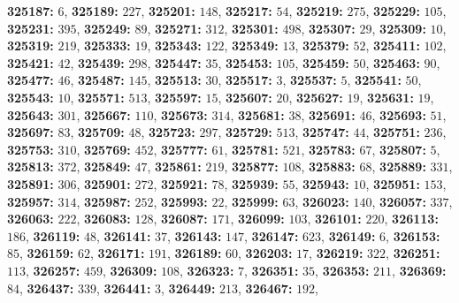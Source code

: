\textsf{\bfseries 325187:} $6$, \textsf{\bfseries 325189:} $227$, \textsf{\bfseries 325201:} $148$, \textsf{\bfseries 325217:} $54$, \textsf{\bfseries 325219:} $275$, \textsf{\bfseries 325229:} $105$, \textsf{\bfseries 325231:} $395$, \textsf{\bfseries 325249:} $89$, \textsf{\bfseries 325271:} $312$, \textsf{\bfseries 325301:} $498$, \textsf{\bfseries 325307:} $29$, \textsf{\bfseries 325309:} $10$, \textsf{\bfseries 325319:} $219$, \textsf{\bfseries 325333:} $19$, \textsf{\bfseries 325343:} $122$, \textsf{\bfseries 325349:} $13$, \textsf{\bfseries 325379:} $52$, \textsf{\bfseries 325411:} $102$, \textsf{\bfseries 325421:} $42$, \textsf{\bfseries 325439:} $298$, \textsf{\bfseries 325447:} $35$, \textsf{\bfseries 325453:} $105$, \textsf{\bfseries 325459:} $50$, \textsf{\bfseries 325463:} $90$, \textsf{\bfseries 325477:} $46$, \textsf{\bfseries 325487:} $145$, \textsf{\bfseries 325513:} $30$, \textsf{\bfseries 325517:} $3$, \textsf{\bfseries 325537:} $5$, \textsf{\bfseries 325541:} $50$, \textsf{\bfseries 325543:} $10$, \textsf{\bfseries 325571:} $513$, \textsf{\bfseries 325597:} $15$, \textsf{\bfseries 325607:} $20$, \textsf{\bfseries 325627:} $19$, \textsf{\bfseries 325631:} $19$, \textsf{\bfseries 325643:} $301$, \textsf{\bfseries 325667:} $110$, \textsf{\bfseries 325673:} $314$, \textsf{\bfseries 325681:} $38$, \textsf{\bfseries 325691:} $46$, \textsf{\bfseries 325693:} $51$, \textsf{\bfseries 325697:} $83$, \textsf{\bfseries 325709:} $48$, \textsf{\bfseries 325723:} $297$, \textsf{\bfseries 325729:} $513$, \textsf{\bfseries 325747:} $44$, \textsf{\bfseries 325751:} $236$, \textsf{\bfseries 325753:} $310$, \textsf{\bfseries 325769:} $452$, \textsf{\bfseries 325777:} $61$, \textsf{\bfseries 325781:} $521$, \textsf{\bfseries 325783:} $67$, \textsf{\bfseries 325807:} $5$, \textsf{\bfseries 325813:} $372$, \textsf{\bfseries 325849:} $47$, \textsf{\bfseries 325861:} $219$, \textsf{\bfseries 325877:} $108$, \textsf{\bfseries 325883:} $68$, \textsf{\bfseries 325889:} $331$, \textsf{\bfseries 325891:} $306$, \textsf{\bfseries 325901:} $272$, \textsf{\bfseries 325921:} $78$, \textsf{\bfseries 325939:} $55$, \textsf{\bfseries 325943:} $10$, \textsf{\bfseries 325951:} $153$, \textsf{\bfseries 325957:} $314$, \textsf{\bfseries 325987:} $252$, \textsf{\bfseries 325993:} $22$, \textsf{\bfseries 325999:} $63$, \textsf{\bfseries 326023:} $140$, \textsf{\bfseries 326057:} $337$, \textsf{\bfseries 326063:} $222$, \textsf{\bfseries 326083:} $128$, \textsf{\bfseries 326087:} $171$, \textsf{\bfseries 326099:} $103$, \textsf{\bfseries 326101:} $220$, \textsf{\bfseries 326113:} $186$, \textsf{\bfseries 326119:} $48$, \textsf{\bfseries 326141:} $37$, \textsf{\bfseries 326143:} $147$, \textsf{\bfseries 326147:} $623$, \textsf{\bfseries 326149:} $6$, \textsf{\bfseries 326153:} $85$, \textsf{\bfseries 326159:} $62$, \textsf{\bfseries 326171:} $191$, \textsf{\bfseries 326189:} $60$, \textsf{\bfseries 326203:} $17$, \textsf{\bfseries 326219:} $322$, \textsf{\bfseries 326251:} $113$, \textsf{\bfseries 326257:} $459$, \textsf{\bfseries 326309:} $108$, \textsf{\bfseries 326323:} $7$, \textsf{\bfseries 326351:} $35$, \textsf{\bfseries 326353:} $211$, \textsf{\bfseries 326369:} $84$, \textsf{\bfseries 326437:} $339$, \textsf{\bfseries 326441:} $3$, \textsf{\bfseries 326449:} $213$, \textsf{\bfseries 326467:} $192$, 
